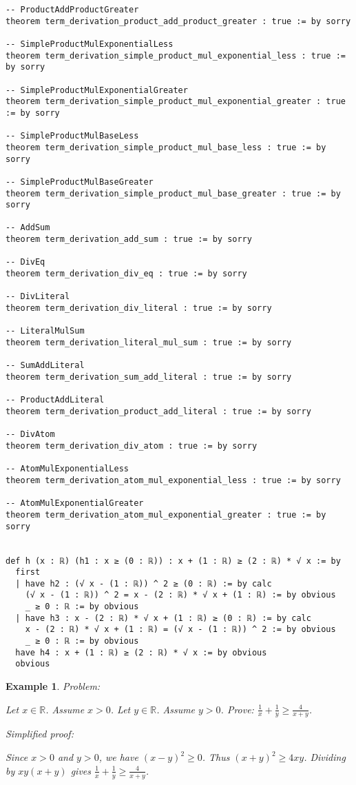 \documentclass{article}
\newtheorem{example}{Example}
\begin{document}
\begin{tcolorbox}[colback=white!10, width=\linewidth]
\begin{lstlisting}[language=Lean4]
-- ProductAddProductGreater
theorem term_derivation_product_add_product_greater : true := by sorry

-- SimpleProductMulExponentialLess
theorem term_derivation_simple_product_mul_exponential_less : true := by sorry

-- SimpleProductMulExponentialGreater
theorem term_derivation_simple_product_mul_exponential_greater : true := by sorry

-- SimpleProductMulBaseLess
theorem term_derivation_simple_product_mul_base_less : true := by sorry

-- SimpleProductMulBaseGreater
theorem term_derivation_simple_product_mul_base_greater : true := by sorry

-- AddSum
theorem term_derivation_add_sum : true := by sorry

-- DivEq
theorem term_derivation_div_eq : true := by sorry

-- DivLiteral
theorem term_derivation_div_literal : true := by sorry

-- LiteralMulSum
theorem term_derivation_literal_mul_sum : true := by sorry

-- SumAddLiteral
theorem term_derivation_sum_add_literal : true := by sorry

-- ProductAddLiteral
theorem term_derivation_product_add_literal : true := by sorry

-- DivAtom
theorem term_derivation_div_atom : true := by sorry

-- AtomMulExponentialLess
theorem term_derivation_atom_mul_exponential_less : true := by sorry

-- AtomMulExponentialGreater
theorem term_derivation_atom_mul_exponential_greater : true := by sorry


def h (x : ℝ) (h1 : x ≥ (0 : ℝ)) : x + (1 : ℝ) ≥ (2 : ℝ) * √ x := by
  first
  | have h2 : (√ x - (1 : ℝ)) ^ 2 ≥ (0 : ℝ) := by calc
    (√ x - (1 : ℝ)) ^ 2 = x - (2 : ℝ) * √ x + (1 : ℝ) := by obvious
    _ ≥ 0 : ℝ := by obvious
  | have h3 : x - (2 : ℝ) * √ x + (1 : ℝ) ≥ (0 : ℝ) := by calc
    x - (2 : ℝ) * √ x + (1 : ℝ) = (√ x - (1 : ℝ)) ^ 2 := by obvious
    _ ≥ 0 : ℝ := by obvious
  have h4 : x + (1 : ℝ) ≥ (2 : ℝ) * √ x := by obvious
  obvious

\end{lstlisting}
\end{tcolorbox}


\begin{example}
Problem:
\begin{tcolorbox}[colback=yellow!10, width=\linewidth]
Let $x\in\mathbb{R}$. Assume $x>0$.
    Let $y\in\mathbb{R}$. Assume $y>0$.
    Prove: $\frac{1}{x} + \frac{1}{y} \ge \frac{4}{x+y}$.
\end{tcolorbox}

Simplified proof:
\begin{tcolorbox}[colback=blue!10, width=\linewidth]
Since $x>0$ and $y>0$, we have $(x-y)^2 \ge 0$. Thus $(x+y)^2 \ge 4xy$. Dividing by $xy(x+y)$ gives $\frac{1}{x}+\frac{1}{y} \ge \frac{4}{x+y}$.
\end{tcolorbox}
\end{example}
\end{document}
